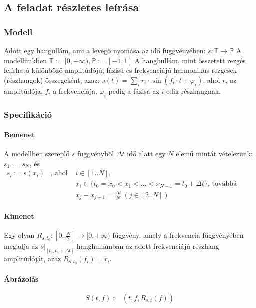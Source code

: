
\subsection{A feladat r\'eszletes le\'ir\'asa}
\subsubsection{Modell}
Adott egy hangull\'am, ami a leveg\H o nyom\'asa az id\H o f\"uggv\'eny\'eben:
\(s: \mathbb{T} \rightarrow \mathbb{P} \) \newline
A modell\"unkben $\mathbb{T}:=[0,+\infty), \mathbb{P}:=[-1,1] $ \newline
A hanghull\'am, mint \"osszetett rezg\'es fel\'irhat\'o k\"ul\"onb\"oz\H o amplit\'ud\'oj\'u, f\'azis\'u \'es frekvenci\'aj\'u harmonikus rezg\'esek (r\'eszhangok) \"osszegek\'ent, azaz: \newline
\( s(t) = \sum_i r_i\cdot\sin{(f_i\cdot t + \varphi_i)} \), ahol $r_i$ az amplit\'ud\'oja, $f_i$ a frekvenci\'aja, $\varphi_i$ pedig a f\'azisa az $i$-edik r\'eszhangnak.
\subsubsection{Specifik\'aci\'o}
\paragraph{Bemenet}
A modellben szerepl\H o $s$ f\"uggv\'enyb\H ol $\Delta t$ id\H o alatt egy $N$ elem\H u mint\'at v\'etelez\"unk: $s_1,\dots,s_{N}$, \'es \newline
\( \begin{array}{rcl}
s_i := s(x_i) & \text{, ahol } & i\in[1..N],\\
&&x_i\in\{ t_0 = x_0 < x_1 < \dots < x_{N-1} = t_0 + \Delta t \} \text{, tov\'abb\'a } \\
&&x_j - x_{j-1} = \frac{\Delta t}{N}\ (j\in[2..N] ) 
\end{array} \)
\paragraph{Kimenet}
Egy olyan $R_{s,t_0}:\left[ 0..\frac{N}{2} \right] \rightarrow [0,+\infty)$ f\"uggv\'eny, amely a frekvencia f\"uggv\'eny\'eben megadja az $s\rvert_{[t_0,t_0+\Delta t]}$ hanghull\'amban az adott frekvenci\'aj\'u r\'eszhang amplit\'ud\'oj\'at, azaz $R_{s,t_0}(f_i) = r_i$.
\paragraph{\'Abr\'azol\'as}

\[
S(t,f):=\left( t , f , R_{s,t}(f) \right)
\]
